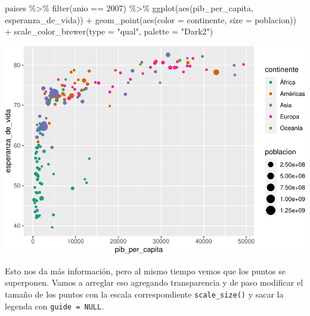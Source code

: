 \documentclass[
  openany]{book}
\newenvironment{Shaded}{\begin{snugshade}}{\end{snugshade}}
\newcommand{\AttributeTok}[1]{\textcolor[rgb]{0.77,0.63,0.00}{#1}}
\newcommand{\DecValTok}[1]{\textcolor[rgb]{0.00,0.00,0.81}{#1}}
\newcommand{\FunctionTok}[1]{\textcolor[rgb]{0.00,0.00,0.00}{#1}}
\newcommand{\NormalTok}[1]{#1}
\newcommand{\SpecialCharTok}[1]{\textcolor[rgb]{0.00,0.00,0.00}{#1}}
\newcommand{\StringTok}[1]{\textcolor[rgb]{0.31,0.60,0.02}{#1}}
\begin{document}
\begin{Shaded}
\begin{Highlighting}[]
\NormalTok{paises }\SpecialCharTok{\%\textgreater{}\%} 
  \FunctionTok{filter}\NormalTok{(anio }\SpecialCharTok{==} \DecValTok{2007}\NormalTok{) }\SpecialCharTok{\%\textgreater{}\%} 
  \FunctionTok{ggplot}\NormalTok{(}\FunctionTok{aes}\NormalTok{(pib\_per\_capita, esperanza\_de\_vida)) }\SpecialCharTok{+}
  \FunctionTok{geom\_point}\NormalTok{(}\FunctionTok{aes}\NormalTok{(}\AttributeTok{color =}\NormalTok{ continente, }\AttributeTok{size =}\NormalTok{ poblacion)) }\SpecialCharTok{+}
  \FunctionTok{scale\_color\_brewer}\NormalTok{(}\AttributeTok{type =} \StringTok{"qual"}\NormalTok{, }\AttributeTok{palette =} \StringTok{"Dark2"}\NormalTok{)}
\end{Highlighting}
\end{Shaded}

\begin{center}\includegraphics[width=1\linewidth]{DT6_files/figure-latex/unnamed-chunk-132-1} \end{center}

Esto nos da más información, pero al mismo tiempo vemos que los puntos se superponen.
Vamos a arreglar eso agregando transparencia y de paso modificar el tamaño de los puntos con la escala correspondiente \texttt{scale\_size()} y sacar la legenda con \texttt{guide\ =\ NULL}.
\end{document}
